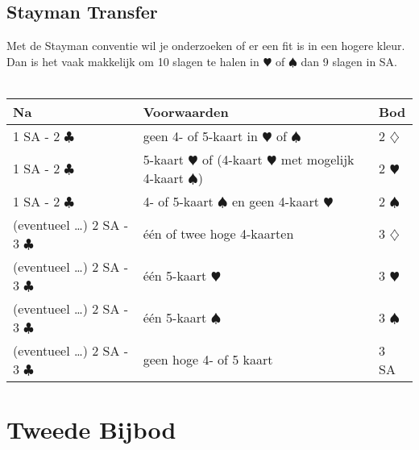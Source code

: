 \documentclass[12pt,a4paper]{report}
\begin{document}
\section{Stayman Transfer}
Met de Stayman conventie wil je onderzoeken of er een fit is 
in een hogere kleur. 
Dan is het vaak makkelijk om 10 slagen te halen
in $\varheartsuit$ of $\spadesuit$ dan 9 slagen in SA.
\\ \ \\
\begin{tabular}{|l|p{}|l|}
	\hline 
	\textbf{Na} &\textbf{Voorwaarden}  &\textbf{Bod}  \\  
	\hline
	
	1 SA - 2 $\clubsuit$
	& geen 4- of 5-kaart in $\varheartsuit$ of $\spadesuit$
	& 2 $\diamondsuit$ \\
	\hline
	
	1 SA - 2 $\clubsuit$
	& 5-kaart $\varheartsuit$\newline
	  of (4-kaart $\varheartsuit$ met mogelijk 4-kaart $\spadesuit$) 
	& 2 $\varheartsuit$ \\
	\hline
		
	1 SA - 2 $\clubsuit$
	& 4- of 5-kaart  $\spadesuit$ \newline
	  en geen 4-kaart $\varheartsuit$
	& 2 $\spadesuit$ \\
	\hline
	\hline
	
	(eventueel \dots) 2 SA - 3 $\clubsuit$
	& \'e\'en of twee hoge 4-kaarten
	& 3  $\diamondsuit$\\
	\hline
	
    (eventueel \dots) 2 SA - 3 $\clubsuit$
	& \'e\'en 5-kaart $\varheartsuit$
	& 3 $\varheartsuit$ \\
	\hline
	
	(eventueel \dots) 2 SA - 3 $\clubsuit$
	& \'e\'en 5-kaart $\spadesuit$
	& 3 $\spadesuit$ \\
	\hline

	(eventueel \dots) 2 SA - 3 $\clubsuit$
	& geen hoge 4- of 5 kaart
	& 3 SA \\
	\hline
\end{tabular}




\chapter{Tweede Bijbod}
\end{document}
